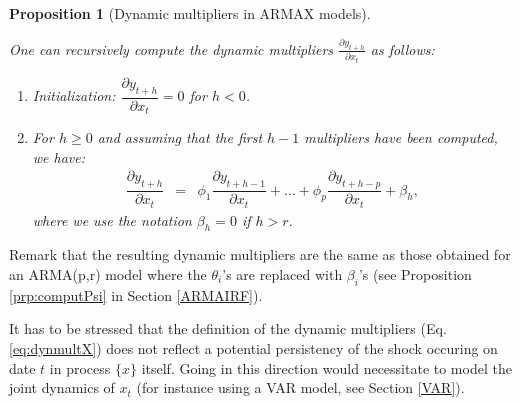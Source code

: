 \documentclass[
  12pt,
]{book}
\providecommand{\tightlist}{%
  \setlength{\itemsep}{0pt}\setlength{\parskip}{0pt}}
\newtheorem{proposition}{Proposition}[chapter]
\theoremstyle{definition}
\theoremstyle{definition}
\theoremstyle{definition}
\theoremstyle{definition}
\theoremstyle{remark}
\begin{document}
\begin{proposition}[Dynamic multipliers in ARMAX models]
\protect\hypertarget{prp:computPsiARMAX}{}\label{prp:computPsiARMAX}

One can recursively compute the dynamic multipliers \(\frac{\partial y_{t+h}}{\partial x_t}\) as follows:

\begin{enumerate}
\def\labelenumi{\roman{enumi}.}
\tightlist
\item
  Initialization: \(\dfrac{\partial y_{t+h}}{\partial x_t}=0\) for \(h<0\).
\item
  For \(h \ge 0\) and assuming that the first \(h-1\) multipliers have been computed, we have:
  \begin{eqnarray}
  \dfrac{\partial y_{t+h}}{\partial x_t} &=& \phi_1 \dfrac{\partial y_{t+h-1}}{\partial x_t} + \dots + \phi_p \dfrac{\partial y_{t+h-p}}{\partial x_t} + \beta_h,\label{eq:dynmultX}
  \end{eqnarray}
  where we use the notation \(\beta_h=0\) if \(h>r\).
\end{enumerate}

\end{proposition}

Remark that the resulting dynamic multipliers are the same as those obtained for an ARMA(p,r) model where the \(\theta_i\)'s are replaced with \(\beta_i\)'s (see Proposition \ref{prp:computPsi} in Section \ref{ARMAIRF}).

It has to be stressed that the definition of the dynamic multipliers (Eq. \eqref{eq:dynmultX}) does not reflect a potential persistency of the shock occuring on date \(t\) in process \(\{x\}\) itself. Going in this direction would necessitate to model the joint dynamics of \(x_t\) (for instance using a VAR model, see Section \ref{VAR}).
\end{document}

